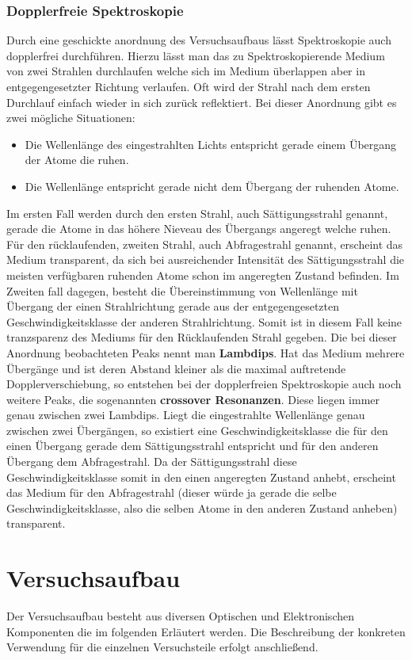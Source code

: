 \documentclass[12pt]{article}
\begin{document}
\subsubsection{Dopplerfreie Spektroskopie}
Durch eine geschickte anordnung des Versuchsaufbaus lässt Spektroskopie auch dopplerfrei durchführen.
Hierzu lässt man das zu Spektroskopierende Medium von zwei Strahlen durchlaufen welche sich im Medium überlappen aber in entgegengesetzter Richtung verlaufen. Oft wird der Strahl nach dem ersten Durchlauf einfach wieder in sich zurück reflektiert. Bei dieser Anordnung gibt es zwei mögliche Situationen:
\begin{itemize}
 \item Die Wellenlänge des eingestrahlten Lichts entspricht gerade einem Übergang der Atome die ruhen.
 \item Die Wellenlänge entspricht gerade nicht dem Übergang der ruhenden Atome.
\end{itemize}
Im ersten Fall werden durch den ersten Strahl, auch Sättigungsstrahl genannt, gerade die Atome in das höhere Nieveau des Übergangs angeregt welche ruhen. Für den rücklaufenden, zweiten Strahl, auch Abfragestrahl genannt, erscheint das Medium transparent, da sich bei ausreichender Intensität des Sättigungsstrahl die meisten verfügbaren ruhenden Atome schon im angeregten Zustand befinden. Im Zweiten fall dagegen, besteht die Übereinstimmung von Wellenlänge mit Übergang der einen Strahlrichtung gerade aus der entgegengesetzten Geschwindigkeitsklasse der anderen Strahlrichtung. Somit ist in diesem Fall keine tranzsparenz des Mediums für den Rücklaufenden Strahl gegeben. Die bei dieser Anordnung beobachteten Peaks nennt man \textbf{Lambdips}. Hat das Medium mehrere Übergänge und ist deren Abstand kleiner als die maximal auftretende Dopplerverschiebung, so entstehen bei der dopplerfreien Spektroskopie auch noch weitere Peaks, die sogenannten \textbf{crossover Resonanzen}. Diese liegen immer genau zwischen zwei Lambdips. Liegt die eingestrahlte Wellenlänge genau zwischen zwei Übergängen, so existiert eine Geschwindigkeitsklasse die für den einen Übergang gerade dem Sättigungsstrahl entspricht und für den anderen Übergang dem Abfragestrahl. Da der Sättigungsstrahl diese Geschwindigkeitsklasse somit in den einen angeregten Zustand anhebt, erscheint das Medium für den Abfragestrahl (dieser würde ja gerade die selbe Geschwindigkeitsklasse, also die selben Atome in den anderen Zustand anheben) transparent.

\section{Versuchsaufbau}
Der Versuchsaufbau besteht aus diversen Optischen und Elektronischen Komponenten die im folgenden Erläutert werden.
Die Beschreibung der konkreten Verwendung für die einzelnen Versuchsteile erfolgt anschließend.
\end{document}

